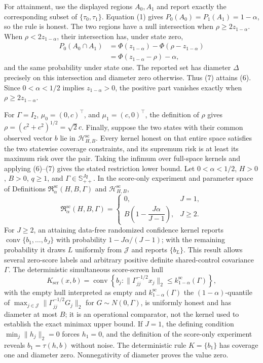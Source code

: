 For attainment, use the displayed regions \(A_0,A_1\) and report exactly the corresponding subset of \(\{\tau_0,\tau_1\}\). Equation (1) gives \(P_0(A_0)=P_1(A_1)=1-\alpha\), so the rule is honest. The two regions have a null intersection when \(\rho\geq2z_{1-\alpha}\). When \(\rho<2z_{1-\alpha}\), their intersection has, under state zero,
\[
\begin{aligned}
 P_0(A_0\cap A_1)
 &=\Phi(z_{1-\alpha})-\Phi(\rho-z_{1-\alpha})\\
 &=\Phi(z_{1-\alpha}-\rho)-\alpha,
\end{aligned}
 \tag{7}
\]
and the same probability under state one. The reported set has diameter \(\Delta\) precisely on this intersection and diameter zero otherwise. Thus (7) attains (6). Since \(0<\alpha<1/2\) implies \(z_{1-\alpha}>0\), the positive part vanishes exactly when \(\rho\geq2z_{1-\alpha}\).

For \(\Gamma=I_2\), \(\mu_0=(0,c)^{\top}\), and \(\mu_1=(c,0)^{\top}\), the definition of \(\rho\) gives \(\rho=(c^2+c^2)^{1/2}=\sqrt{2}c\). Finally, suppose the two states with their common observed vector \(b\) lie in \(\mathcal H_{H,B}^{\mathrm{sc}}\). Every kernel honest on that entire space satisfies the two statewise coverage constraints, and its supremum risk is at least its maximum risk over the pair. Taking the infimum over full-space kernels and applying (6)--(7) gives the stated restriction lower bound.
Let \(0<\alpha<1/2\), \(H>0\), \(B>0\), \(q\geq1\), and \(\Gamma\in\mathbb S_{++}^{Jq}\). In the score-only experiment and parameter space of Definitions \(\mathfrak R_{\alpha}^{\mathrm{sc}}(H,B,\Gamma)\) and \(\mathcal H_{H,B}^{\mathrm{sc}}\),
\[
 \mathfrak R_{\alpha}^{\mathrm{sc}}(H,B,\Gamma)
 =
 \begin{cases}
 0, & J=1,\\[2mm]
 B\left(1-\dfrac{J\alpha}{J-1}\right), & J\geq2.
 \end{cases}
\]
For \(J\geq2\), an attaining data-free randomized confidence kernel reports \(\operatorname{conv}\{b_1,\ldots,b_J\}\) with probability \(1-J\alpha/(J-1)\); with the remaining probability it draws \(L\) uniformly from \(\mathcal J\) and reports \(\{b_L\}\). This result allows several zero-score labels and arbitrary positive definite shared-control covariance \(\Gamma\). The deterministic simultaneous score-screen hull
\[
 K_{\mathrm{scr}}(x,b)
 =\operatorname{conv}\left\{b_j:
 \lVert\Gamma_{jj}^{-1/2}x_j\rVert_2
 \leq k_{1-\alpha}^{\mathrm{sc}}(\Gamma)
 \right\},
\]
with the empty hull interpreted as empty and \(k_{1-\alpha}^{\mathrm{sc}}(\Gamma)\) the \((1-\alpha)\)-quantile of \(\max_{j\in\mathcal J}\lVert\Gamma_{jj}^{-1/2}G_j\rVert_2\) for \(G\sim N(0,\Gamma)\), is uniformly honest and has diameter at most \(B\); it is an operational comparator, not the kernel used to establish the exact minimax upper bound.
If \(J=1\), the defining condition \(\min_j\lVert h_j\rVert_2=0\) forces \(h_1=0\), and the definition of the score-only experiment reveals \(b_1=\tau(h,b)\) without noise. The deterministic rule \(K=\{b_1\}\) has coverage one and diameter zero. Nonnegativity of diameter proves the value zero.

